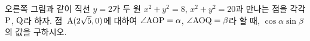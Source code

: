 \noindent\begin{minipage}[t]{0.58\linewidth}\vspace{0pt}\raggedright 오른쪽 그림과 같이 직선 $y=2$가 두 원 $x^{2}+y^{2}=8$, $x^{2}+y^{2}=20$과 만나는 점을 각각 $\mathrm{P}$, $\mathrm{Q}$라 하자. 점~$\mathrm{A}(2\sqrt{5}{,}\mkern3mu\mathopen{}0)$에 대하여 $\angle\mathrm{AOP}=\alpha$, $\angle\mathrm{AOQ}=\beta$라 할 때, $\cos\alpha\sin\beta$의 값을 구하시오. \end{minipage}\hfill\begin{minipage}[t]{0.4\linewidth}\vspace{0pt}\centering \resizebox{\ifdim\width>\linewidth\linewidth\else\width\fi}{!}{}\end{minipage}\par
